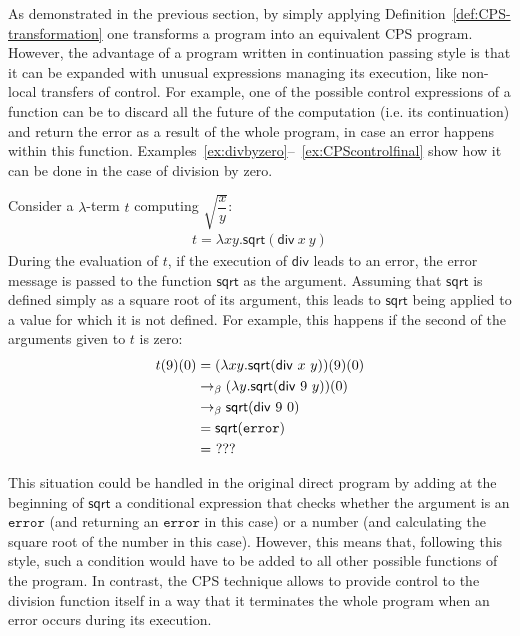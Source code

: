As demonstrated in the previous section, by simply applying Definition~\ref{def:CPS-transformation} one transforms a program into an equivalent CPS program. However, the advantage of a program written in continuation passing style is that it can be expanded with unusual expressions managing its execution, like non-local transfers of control. For example, one of the possible control expressions of a function can be to  discard all the future of the computation (i.e. its continuation) and return the error as a result of the whole program, in case an error happens within this function. Examples~\ref{ex:divbyzero}--~\ref{ex:CPScontrolfinal} show how it can be done in the case of division by zero.
%
\begin{example} \label{ex:divbyzero}
 Consider a $\lambda$-term $t$ computing  $\sqrt{ \dfrac{x}{y}}$: 
\begin{align}
t = \lambda xy. \mathsf{sqrt} (\mathsf{div} \ x \ y) \label{eq:tstat}
\end{align}
%
During the evaluation of $t$, if the execution of $\mathsf{div}$ leads to an error, the error message is passed to the function $\mathsf{sqrt}$ as the argument. Assuming that $\mathsf{sqrt}$ is defined simply as a square root of its argument, this leads to $\mathsf{sqrt}$ being applied to a value for which it is not defined.  For example, this happens if the second of the arguments given to $t$ is zero:
%
\begin{align}
t(9)(0) & =  (\lambda xy. \mathsf{sqrt} (\mathsf{div} \ x \ y))(9)(0)  \notag \\
& \bconv   (\lambda y. \mathsf{sqrt} (\mathsf{div} \ 9 \ y) ) (0)  \notag \\
& \bconv \mathsf{sqrt} (\mathsf{div} \ 9 \ 0)  \notag \\
& = \mathsf{sqrt} (\mathtt{error} ) \label{sqrterrow}\\
& =  \ ??? \notag
\end{align}

\end{example}

This situation could be handled in the original direct program by adding at the beginning of $\mathsf{sqrt}$ a conditional expression that checks whether the argument is an $\mathtt{error}$ (and returning an  $\mathtt{error}$ in this case) or a number (and calculating the square root of the number in this case). However, this means that, following this style, such a condition would have to be added to all other possible functions of the program. In contrast, the CPS technique allows to provide control to the division function itself in a way that it terminates the whole program when an error occurs during its execution.


